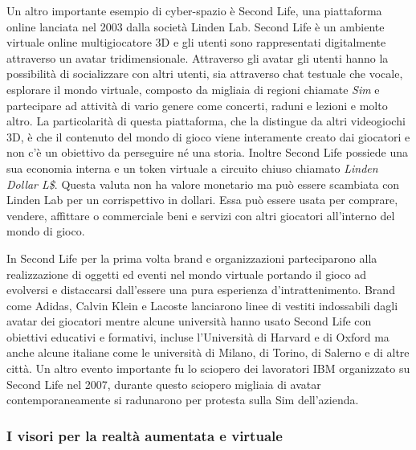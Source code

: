         Un altro importante esempio di cyber-spazio è Second Life, una piattaforma online lanciata nel 2003 dalla società Linden Lab.
        Second Life è un ambiente virtuale online multigiocatore 3D e  gli utenti sono rappresentati digitalmente attraverso un avatar tridimensionale.
        Attraverso gli avatar gli utenti hanno la possibilità di socializzare con altri utenti, sia attraverso chat testuale che vocale, esplorare il mondo virtuale, composto da migliaia di regioni chiamate \textit{Sim} e partecipare ad attività di vario genere come concerti, raduni e lezioni e molto altro.
        La particolarità di questa piattaforma, che la distingue da altri videogiochi 3D, è che il contenuto del mondo di gioco viene interamente creato dai giocatori e non c'è un obiettivo da perseguire né una storia.
        Inoltre Second Life possiede una sua economia interna e un token virtuale a circuito chiuso chiamato \textit{Linden Dollar L\$}. 
        Questa valuta non ha valore monetario ma può essere scambiata con Linden Lab per un corrispettivo in dollari.
        Essa può essere usata per comprare, vendere, affittare o commerciale beni e servizi con altri giocatori all'interno del mondo di gioco.
        
        In Second Life per la prima volta brand e organizzazioni parteciparono alla realizzazione di oggetti ed eventi nel mondo virtuale portando il gioco ad evolversi e distaccarsi dall'essere una pura esperienza d'intrattenimento. 
        Brand come Adidas, Calvin Klein e Lacoste lanciarono linee di vestiti indossabili dagli avatar dei giocatori \cite{Fascion2nd} mentre alcune università hanno usato Second Life con obiettivi educativi e formativi, incluse l'Università di Harvard e di Oxford \cite{University2ndLife} ma anche alcune italiane come le università di Milano, di Torino, di Salerno e di altre città. \cite{UnitoIn2ndLife, 2ndLifeWikipedia} 
        Un altro evento importante fu lo sciopero dei lavoratori IBM organizzato su Second Life nel 2007, durante questo sciopero migliaia di avatar contemporaneamente si radunarono per protesta sulla Sim dell'azienda. \cite{2ndLifeWikipedia}
        
        \subsubsection{I visori per la realtà aumentata e virtuale} %

